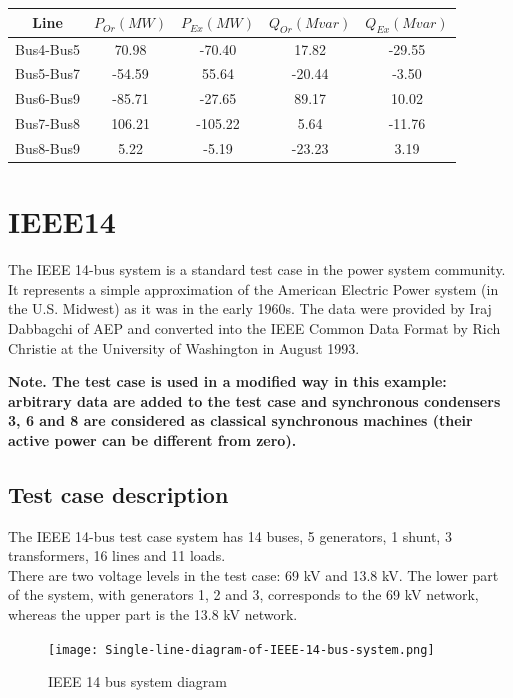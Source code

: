 \documentclass[a4paper, 12pt]{report}
\begin{document}
\begin{center}
\begin{tabular}{|c|c|c|c|c|}
  \hline
  Line & $P_{Or} (MW)$ & $P_{Ex} (MW)$ & $Q_{Or} (Mvar)$ & $Q_{Ex} (Mvar)$ \\
  \hline
  Bus4-Bus5 & 70.98 & -70.40 & 17.82 & -29.55 \\
  Bus5-Bus7 & -54.59 & 55.64 & -20.44 & -3.50 \\
  Bus6-Bus9 & -85.71 & -27.65 & 89.17 & 10.02 \\
  Bus7-Bus8 & 106.21 & -105.22 & 5.64 & -11.76 \\
  Bus8-Bus9 & 5.22 & -5.19 & -23.23 & 3.19 \\
  \hline
\end{tabular}
\end{center}

\chapter{IEEE14}

The IEEE 14-bus system is a standard test case in the power system community. It represents a simple approximation of the American Electric Power system (in the U.S. Midwest) as it was in the early 1960s. The data were provided by Iraj Dabbagchi of AEP and converted into the IEEE Common Data Format by Rich Christie at the University of Washington in August 1993.

\textbf{Note. The test case is used in a modified way in this example: arbitrary data are added to the test case and synchronous condensers 3, 6 and 8 are considered as classical synchronous machines (their active power can be different from zero).}

\section{Test case description}

The IEEE 14-bus test case system has 14 buses, 5 generators, 1 shunt, 3 transformers, 16 lines and 11 loads.\\
There are two voltage levels in the test case: 69 kV and 13.8 kV. The lower part of the system, with generators 1, 2 and 3, corresponds to the 69 kV network, whereas the upper part is the 13.8 kV network.

\begin{figure}[H]
  \texttt{[image: Single-line-diagram-of-IEEE-14-bus-system.png]}
  \caption{IEEE 14 bus system diagram}
\end{figure}
\end{document}

